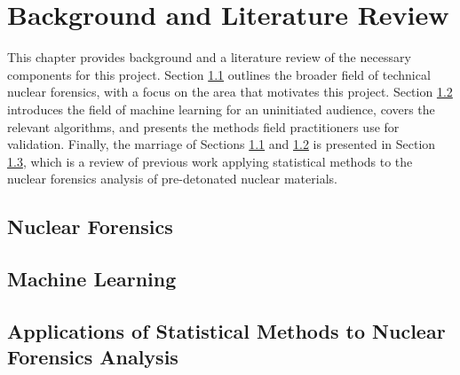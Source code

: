 
\glsresetall

\chapter{Background and Literature Review}
\label{ch:litrev}

This chapter provides background and a literature review of the necessary
components for this project. Section \ref{sec:nfoverview} outlines the broader
field of technical nuclear forensics, with a focus on the area that motivates
this project.  Section \ref{sec:mlback} introduces the field of machine
learning for an uninitiated audience, covers the relevant algorithms, and
presents the methods field practitioners use for validation.  Finally, the
marriage of Sections \ref{sec:nfoverview} and \ref{sec:mlback} is presented in
Section \ref{sec:stats4nf}, which is a review of previous work applying
statistical methods to the nuclear forensics analysis of pre-detonated nuclear
materials. 

\section{Nuclear Forensics}
\label{sec:nfoverview}


\section{Machine Learning}
\label{sec:mlback}


\section{Applications of Statistical Methods to Nuclear Forensics Analysis}
\label{sec:stats4nf}


